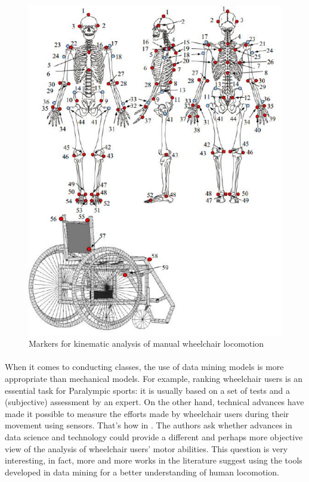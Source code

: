 \begin{itemize}
\begin{figure}[h]
\center
\includegraphics[scale = 0.5]{images/squelette}
\caption{Markers for kinematic analysis of manual wheelchair locomotion\cite{Sauret2010}}
\label{Wheelchair_model2}
\end{figure}

\end{itemize}


\paragraph{} When it comes to conducting classes, the use of data mining models is more appropriate than mechanical models. For example, ranking wheelchair users is an essential task for Paralympic sports: it is usually based on a set of tests and a (subjective) assessment by an expert. On the other hand, technical advances have made it possible to measure the efforts made by wheelchair users during their movement using sensors. That's how in \cite{van2017future}. The authors ask whether advances in data science and technology could provide a different and perhaps more objective view of the analysis of wheelchair users' motor abilities. This question is very interesting, in fact, more and more works in the literature suggest using the tools developed in data mining for a better understanding of human locomotion. 

